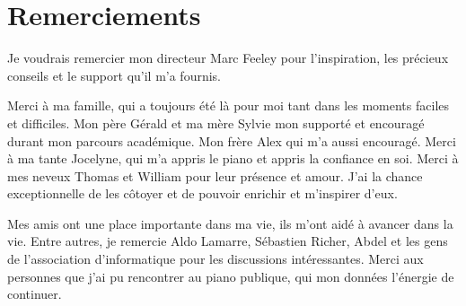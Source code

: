 \documentclass[12pt,maitrise]{dms}
\theoremstyle{definition}
\numberwithin{equation}{section}
\numberwithin{table}{chapter}
\numberwithin{figure}{chapter}
\begin{document}

\chapter*{Remerciements}

Je voudrais remercier mon directeur Marc Feeley pour l'inspiration,
les précieux conseils et le support qu'il m'a fournis.

Merci à ma famille, qui a toujours été là pour moi tant dans les moments
faciles et difficiles. Mon père Gérald et ma mère Sylvie mon supporté et
encouragé durant mon parcours académique. Mon frère Alex qui m'a aussi
encouragé. Merci à ma tante Jocelyne, qui m'a appris le piano et appris la
confiance en soi.  Merci à mes neveux Thomas et William pour leur présence et
amour. J'ai la chance exceptionnelle de les côtoyer et de pouvoir enrichir et
m'inspirer d'eux.

Mes amis ont une place importante dans ma vie, ils m'ont aidé
à avancer dans la vie. Entre autres, je remercie Aldo Lamarre,
Sébastien Richer, Abdel et les gens de l'association d'informatique
pour les discussions intéressantes. Merci aux personnes que j'ai
pu rencontrer au piano publique, qui mon données l'énergie de
continuer.


\NoChapterPageNumber%
\cleardoublepage


%




%






\newpage

\end{document}
